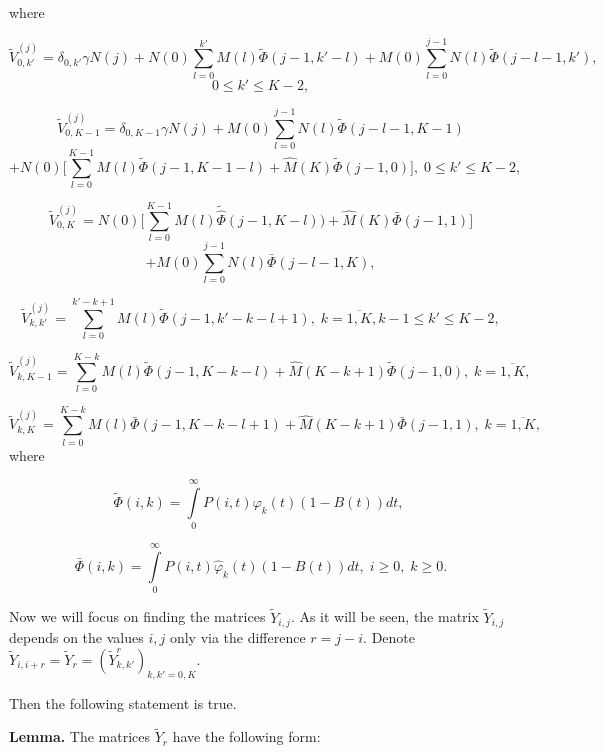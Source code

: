 \documentclass[12pt, a4paper]{article}
\begin{document}
where

$$\tilde {V}_{0,k'}^{(j)}=\delta_{0, k'}\gamma N(j)+
 N(0)\sum\limits_{l=0}^{k'}M(l) \tilde{\Phi}(j-1,k'-l)+
 M(0)\sum\limits_{l=0}^{j-1} N(l) \tilde{\Phi}(j-l-1, k'),
$$
$$
 0\leq k'\leq K-2,
$$


$$ \tilde {V}_{0,K-1}^{(j)}=\delta_{0, K-1}\gamma N(j)+ M(0)\sum\limits_{l=0}^{j-1}N(l)\tilde{\Phi}(j-l-1,K-1)
$$
$$
+ N(0)\biggl[\sum\limits_{l=0}^{K-1}
M(l)  \tilde{\Phi}(j-1,K-1-l)+\hat{M}(K)\tilde{\Phi}(j-1,0)\biggr],\; 0\leq k'\leq K-2,
$$



$$
 \tilde {V}_{0,K}^{(j)}= N(0)\biggl[\sum\limits_{l=0}^{K-1} M(l)\tilde{\hat\Phi}(j-1, K-l))+
 \hat{M}(K){\bar\Phi}(j-1,1)\biggr]
 $$
$$
+ M(0)\sum\limits_{l=0}^{j-1}N(l){\bar\Phi}(j-l-1, K),
$$



$$
 \tilde {V}_{k,k'}^{(j)}=
 \sum\limits_{l=0}^{k'-k+1} M(l)\tilde{\Phi}(j-1, k'-k-l+1),\; k=\overline{1,K}, k-1\leq k'\leq K-2,
$$

$$
 \tilde V_{k,K-1}^{(j)}= \sum\limits_{l=0}^{K-k} M(l)\tilde{\Phi}(j-1,K-k-l)+
  \hat{M}(K-k+1)\tilde{\Phi}(j-1,0),\; k=\overline{1,K},
$$


$$
\tilde {V}_{k,K}^{(j)}= \sum\limits_{l=0}^{K-k}M(l) {\bar \Phi}(j-1, K-k-l+1)
+ \hat{M}(K-k+1){\bar \Phi}(j-1,1),\;k=\overline{1, K},
$$
where

$$ \tilde{\Phi}(i,k) = \int\limits_{0}^{\infty} P(i,t)\varphi_{k}(t)(1-B(t))dt,\; $$

$$ {\bar\Phi}(i, k) = \int\limits_{0}^{\infty}  P(i, t) \hat\varphi_{k}(t)(1-B(t))dt,\; i \geq 0,\; k \geq 0.  $$





Now we will focus on  finding the matrices $\tilde{Y}_{i,j}$. As it will be  seen, the matrix  $\tilde{Y}_{i,j}$ depends on the values $i, j$ only via the difference $r=j-i.$ Denote  $\tilde{Y}_{i,i+r}=\tilde{Y}_r=(\tilde{Y}_{k,k'}^r)_{k,k'=0,K}. $

Then the following statement is true.

{\bf Lemma.}  The matrices $\tilde{Y}_r$ have the following form:
\end{document}
